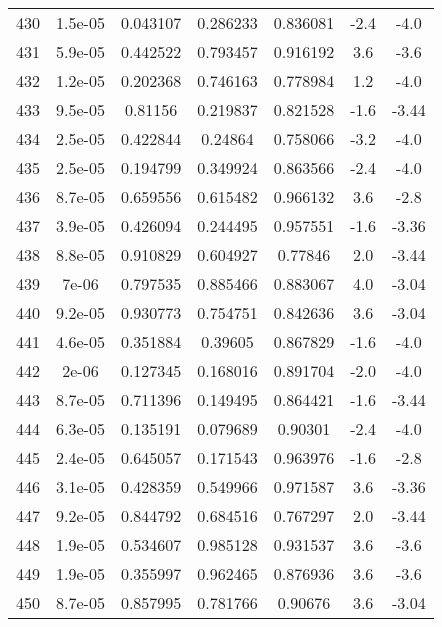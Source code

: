 \begin{table}
\begin{tabular}{c|c|c|c|c|c|c}
430 & 1.5e-05 & 0.043107 & 0.286233 & 0.836081 & -2.4 & -4.0\\
431 & 5.9e-05 & 0.442522 & 0.793457 & 0.916192 & 3.6 & -3.6\\
432 & 1.2e-05 & 0.202368 & 0.746163 & 0.778984 & 1.2 & -4.0\\
433 & 9.5e-05 & 0.81156 & 0.219837 & 0.821528 & -1.6 & -3.44\\
434 & 2.5e-05 & 0.422844 & 0.24864 & 0.758066 & -3.2 & -4.0\\
435 & 2.5e-05 & 0.194799 & 0.349924 & 0.863566 & -2.4 & -4.0\\
436 & 8.7e-05 & 0.659556 & 0.615482 & 0.966132 & 3.6 & -2.8\\
437 & 3.9e-05 & 0.426094 & 0.244495 & 0.957551 & -1.6 & -3.36\\
438 & 8.8e-05 & 0.910829 & 0.604927 & 0.77846 & 2.0 & -3.44\\
439 & 7e-06 & 0.797535 & 0.885466 & 0.883067 & 4.0 & -3.04\\
440 & 9.2e-05 & 0.930773 & 0.754751 & 0.842636 & 3.6 & -3.04\\
441 & 4.6e-05 & 0.351884 & 0.39605 & 0.867829 & -1.6 & -4.0\\
442 & 2e-06 & 0.127345 & 0.168016 & 0.891704 & -2.0 & -4.0\\
443 & 8.7e-05 & 0.711396 & 0.149495 & 0.864421 & -1.6 & -3.44\\
444 & 6.3e-05 & 0.135191 & 0.079689 & 0.90301 & -2.4 & -4.0\\
445 & 2.4e-05 & 0.645057 & 0.171543 & 0.963976 & -1.6 & -2.8\\
446 & 3.1e-05 & 0.428359 & 0.549966 & 0.971587 & 3.6 & -3.36\\
447 & 9.2e-05 & 0.844792 & 0.684516 & 0.767297 & 2.0 & -3.44\\
448 & 1.9e-05 & 0.534607 & 0.985128 & 0.931537 & 3.6 & -3.6\\
449 & 1.9e-05 & 0.355997 & 0.962465 & 0.876936 & 3.6 & -3.6\\
450 & 8.7e-05 & 0.857995 & 0.781766 & 0.90676 & 3.6 & -3.04\\
\end{tabular}
\end{table}
\newpage
